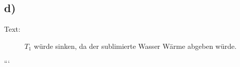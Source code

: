 

\subsection*{d)}
\begin{description}
    \item[Text:] $T_1$ würde sinken, da der sublimierte Wasser Wärme abgeben würde.
\end{description}

```
